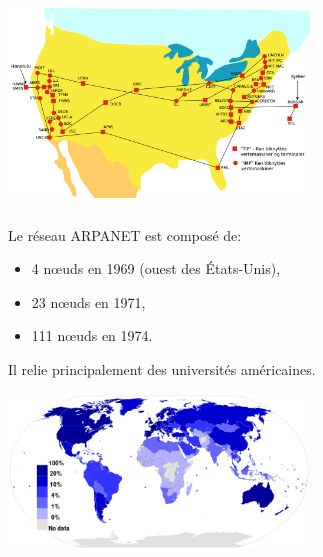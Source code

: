 \documentclass[svgnames,11pt]{beamer}
\begin{document}
\begin{frame}

    \begin{center}
    \centering
    \includegraphics[width=8cm]{ressources/arpanet.png}
    \label{IMG}
    \end{center}

\end{frame}
\begin{frame}
    \frametitle{}

    \begin{aretenir}[]
    Le réseau ARPANET est composé de:
    \begin{itemize}
        \item 4 nœuds en 1969 (ouest des États-Unis),
        \item 23 nœuds en 1971, 
        \item 111 nœuds en 1974.
    \end{itemize}
    Il relie principalement des universités américaines.
    \end{aretenir}

\end{frame}
\begin{frame}

    \begin{center}
    \centering
    \includegraphics[width=8cm]{ressources/internet.png}
    \label{IMG}
    \end{center}

\end{frame}
\end{document}
